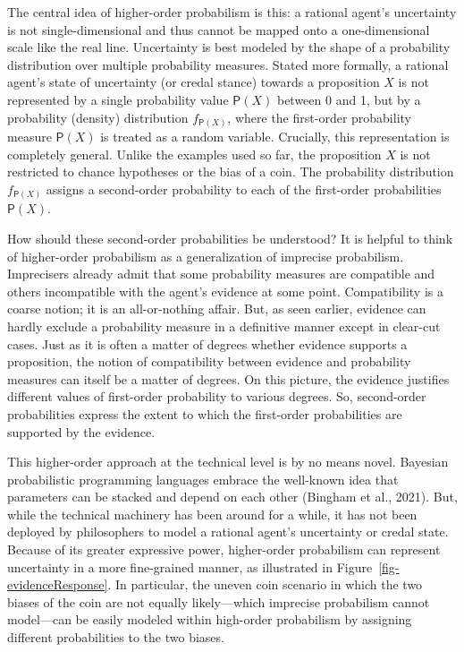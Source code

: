 \documentclass[
  letterpaper,
  DIV=11,
  numbers=noendperiod]{scrartcl}
\begin{document}
The central idea of higher-order probabilism is this: a rational agent's
uncertainty is not single-dimensional and thus cannot be mapped onto a
one-dimensional scale like the real line. Uncertainty is best modeled by
the shape of a probability distribution over multiple probability
measures. Stated more formally, a rational agent's state of uncertainty
(or credal stance) towards a proposition \(X\) is not represented by a
single probability value \(\mathsf{P}(X)\) between 0 and 1, but by a
probability (density) distribution \(f_{\mathsf{P}(X)}\), where the
first-order probability measure \(\mathsf{P}(X)\) is treated as a random
variable. Crucially, this representation is completely general. Unlike
the examples used so far, the proposition \(X\) is not restricted to
chance hypotheses or the bias of a coin. The probability distribution
\(f_{\mathsf{P}(X)}\) assigns a second-order probability to each of the
first-order probabilities \(\mathsf{P}(X)\).

How should these second-order probabilities be understood? It is helpful
to think of higher-order probabilism as a generalization of imprecise
probabilism. Imprecisers already admit that some probability measures
are compatible and others incompatible with the agent's evidence at some
point. Compatibility is a coarse notion; it is an all-or-nothing affair.
But, as seen earlier, evidence can hardly exclude a probability measure
in a definitive manner except in clear-cut cases. Just as it is often a
matter of degrees whether evidence supports a proposition, the notion of
compatibility between evidence and probability measures can itself be a
matter of degrees. On this picture, the evidence justifies different
values of first-order probability to various degrees. So, second-order
probabilities express the extent to which the first-order probabilities
are supported by the evidence.

This higher-order approach at the technical level is by no means novel.
Bayesian probabilistic programming languages embrace the well-known idea
that parameters can be stacked and depend on each other (Bingham et al.,
2021). But, while the technical machinery has been around for a while,
it has not been deployed by philosophers to model a rational agent's
uncertainty or credal state. Because of its greater expressive power,
higher-order probabilism can represent uncertainty in a more
fine-grained manner, as illustrated in
Figure~\ref{fig-evidenceResponse}. In particular, the uneven coin
scenario in which the two biases of the coin are not equally
likely---which imprecise probabilism cannot model---can be easily
modeled within high-order probabilism by assigning different
probabilities to the two biases.
\end{document}
